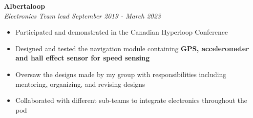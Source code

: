 \documentclass[a4paper,20pt]{article}
\begin{document}

    \vspace{-1pt}
        \textbf{Albertaloop}
        \vspace{2pt}
        \textit{}\\
        \textit{Electronics Team lead} \hspace{10.2cm}
        \textit{September 2019 - March 2023}
        \vspace{-5pt} 
        \hspace{-10pt}
    \begin{itemize}
        \item Participated and demonstrated in the Canadian Hyperloop Conference \vspace{-5pt}
        \item Designed and tested the navigation module containing \textbf{GPS, accelerometer and hall effect sensor for speed sensing} \vspace{-5pt} 
        \item Oversaw the designs made by my group with responsibilities including mentoring, organizing, and revising designs \vspace{-5pt}
        \item Collaborated with different sub-teams to integrate electronics throughout the pod
    \end{itemize}

\end{document}
